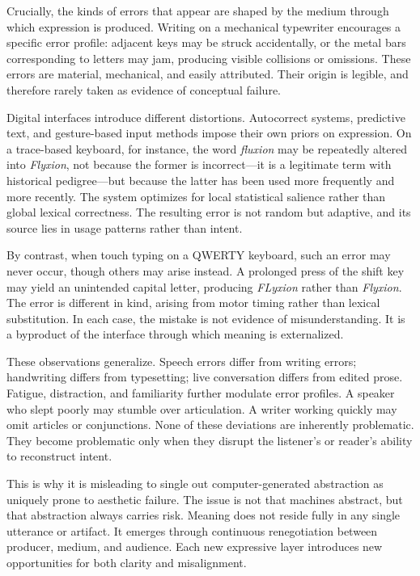 \documentclass[12pt]{article}
\begin{document}
Crucially, the kinds of errors that appear are shaped by the medium through which expression is produced. Writing on a mechanical typewriter encourages a specific error profile: adjacent keys may be struck accidentally, or the metal bars corresponding to letters may jam, producing visible collisions or omissions. These errors are material, mechanical, and easily attributed. Their origin is legible, and therefore rarely taken as evidence of conceptual failure.

Digital interfaces introduce different distortions. Autocorrect systems, predictive text, and gesture-based input methods impose their own priors on expression. On a trace-based keyboard, for instance, the word \emph{fluxion} may be repeatedly altered into \emph{Flyxion}, not because the former is incorrect—it is a legitimate term with historical pedigree—but because the latter has been used more frequently and more recently. The system optimizes for local statistical salience rather than global lexical correctness. The resulting error is not random but adaptive, and its source lies in usage patterns rather than intent.

By contrast, when touch typing on a QWERTY keyboard, such an error may never occur, though others may arise instead. A prolonged press of the shift key may yield an unintended capital letter, producing \emph{FLyxion} rather than \emph{Flyxion}. The error is different in kind, arising from motor timing rather than lexical substitution. In each case, the mistake is not evidence of misunderstanding. It is a byproduct of the interface through which meaning is externalized.

These observations generalize. Speech errors differ from writing errors; handwriting differs from typesetting; live conversation differs from edited prose. Fatigue, distraction, and familiarity further modulate error profiles. A speaker who slept poorly may stumble over articulation. A writer working quickly may omit articles or conjunctions. None of these deviations are inherently problematic. They become problematic only when they disrupt the listener’s or reader’s ability to reconstruct intent.

This is why it is misleading to single out computer-generated abstraction as uniquely prone to aesthetic failure. The issue is not that machines abstract, but that abstraction always carries risk. Meaning does not reside fully in any single utterance or artifact. It emerges through continuous renegotiation between producer, medium, and audience. Each new expressive layer introduces new opportunities for both clarity and misalignment.
\end{document}
